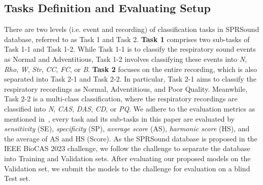 \documentclass[conference]{IEEEtran}
\begin{document}
\subsection{Tasks Definition and Evaluating Setup}

There are two levels (i.e. event and recording) of classification tasks in SPRSound database, referred to as Task 1 and Task 2. \textbf{Task 1} comprises two sub-tasks of Task 1-1 and Task 1-2. While Task 1-1 is to classify the respiratory sound events as Normal and Adventitious, Task 1-2 involves classifying these events into \textit{N}, \textit{Rho}, \textit{W}, \textit{Str}, \textit{CC}, \textit{FC}, or \textit{B}. 
%
\textbf{Task 2} focuses on the entire recording, which is also separated into Task 2-1 and Task 2-2. 
In particular, Task 2-1 aims to classify the respiratory recordings as Normal, Adventitious, and Poor Quality. Meanwhile, Task 2-2 is a multi-class classification, where the respiratory recordings are classified into \textit{N}, \textit{CAS}, \textit{DAS}, \textit{CD}, or \textit{PQ}. We adhere to the evaluation metrics as mentioned in~\cite{zhang2022sprsound}, every task and its sub-tasks in this paper are evaluated by \textit{sensitivity} (SE), \textit{specificity} (SP), \textit{average score} (AS), \textit{harmonic score} (HS), and the average of AS and HS (Score). As the SPRSound database is proposed in the IEEE BioCAS 2023 challenge, we follow the challenge to separate the database into Training and Validation sets. After evaluating our proposed models on the Validation set, we submit the models to the challenge for evaluation on a blind Test set. 







\end{document}
